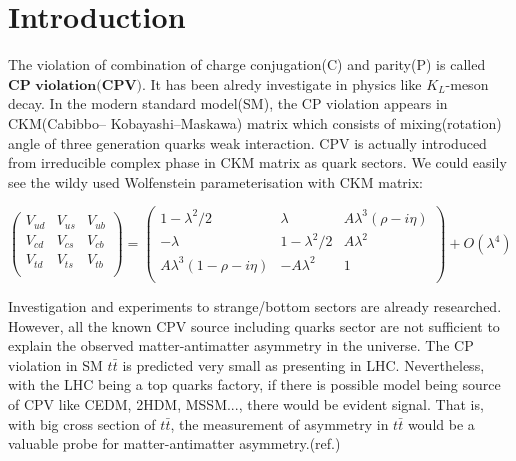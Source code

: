 

\section{Introduction}
\label{sec:Introduction}

	The violation of combination of charge conjugation(C) and parity(P) is called $\textbf{CP violation(CPV)}$. It has been alredy investigate in physics like $K_L$-meson decay. In the modern standard model(SM), the CP violation appears in CKM(Cabibbo– Kobayashi–Maskawa) matrix which consists of mixing(rotation) angle of three generation quarks weak interaction. CPV is actually introduced from irreducible complex phase in CKM matrix as quark sectors. We could easily see the wildy used Wolfenstein parameterisation with CKM matrix:

	\begin{equation}
  		\begin{pmatrix}
  		V_{ud} & V_{us} & V_{ub} \\
  		V_{cd} & V_{cs} & V_{cb} \\
  		V_{td} & V_{ts} & V_{tb} \\
  		\end{pmatrix}
  		=
  		\begin{pmatrix}
  		1 - \lambda^2/2 & \lambda & A \lambda^3(\rho -i \eta) \\
  		-\lambda & 1 - \lambda^2/2 & A \lambda^2 \\
  		A \lambda^3(1 - \rho -i \eta) & - A \lambda^2 & 1 \\
  		\end{pmatrix} 
  		+ O(\lambda^4)
	\end{equation}

	Investigation and experiments to strange/bottom sectors are already researched. However, all the known CPV source including quarks sector are not sufficient to explain the observed matter-antimatter asymmetry in the universe. The CP violation in SM $t\bar{t}$ is predicted very small as presenting in LHC. Nevertheless, with the LHC being a top quarks factory, if there is possible model being source of CPV like CEDM, 2HDM, MSSM..., there would be evident signal. That is, with big cross section of $t\bar{t}$, the measurement of asymmetry in $t\bar{t}$ would be a valuable probe for matter-antimatter asymmetry.(ref.\cite{Olive_2014})

